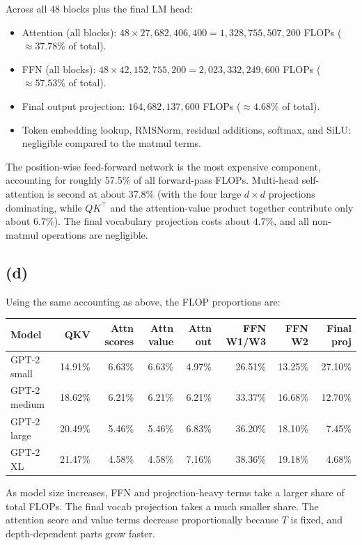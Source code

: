 \documentclass[11pt]{article}
\begin{document}
Across all 48 blocks plus the final LM head:
\begin{itemize}
    \item Attention (all blocks): $48 \times 27{,}682{,}406{,}400 = 1{,}328{,}755{,}507{,}200$ FLOPs ($\approx 37.78\%$ of total).
    \item FFN (all blocks): $48 \times 42{,}152{,}755{,}200 = 2{,}023{,}332{,}249{,}600$ FLOPs ($\approx 57.53\%$ of total).
    \item Final output projection: $164{,}682{,}137{,}600$ FLOPs ($\approx 4.68\%$ of total).
    \item Token embedding lookup, RMSNorm, residual additions, softmax, and SiLU: negligible compared to the matmul terms.
\end{itemize}

The position-wise feed-forward network is the most expensive component, accounting for roughly 57.5\% of all forward-pass FLOPs. Multi-head self-attention is second at about 37.8\% (with the four large $d \times d$ projections dominating, while $QK^\top$ and the attention-value product together contribute only about $6.7\%$). The final vocabulary projection costs about $4.7\%$, and all non-matmul operations are negligible.

\subsection*{(d)}
Using the same accounting as above, the FLOP proportions are:

\begin{center}
\begin{tabular}{lrrrrrrr}
\toprule
Model & QKV & Attn scores & Attn value & Attn out & FFN W1/W3 & FFN W2 & Final proj \\
\midrule
GPT-2 small  & 14.91\% & 6.63\% & 6.63\% & 4.97\% & 26.51\% & 13.25\% & 27.10\% \\
GPT-2 medium & 18.62\% & 6.21\% & 6.21\% & 6.21\% & 33.37\% & 16.68\% & 12.70\% \\
GPT-2 large  & 20.49\% & 5.46\% & 5.46\% & 6.83\% & 36.20\% & 18.10\% & 7.45\% \\
GPT-2 XL     & 21.47\% & 4.58\% & 4.58\% & 7.16\% & 38.36\% & 19.18\% & 4.68\% \\
\bottomrule
\end{tabular}
\end{center}

As model size increases, FFN and projection-heavy terms take a larger share of total FLOPs. The final vocab projection takes a much smaller share. The attention score and value terms decrease proportionally because \(T\) is fixed, and depth-dependent parts grow faster.
\end{document}
